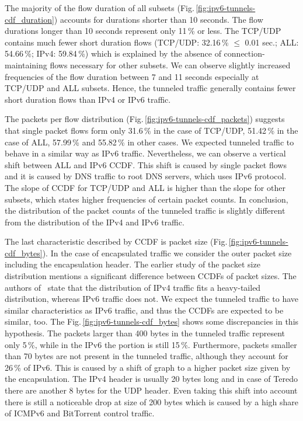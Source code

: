 The majority of the flow duration of all subsets (Fig.\,\ref{fig:ipv6-tunnels-cdf_duration}) accounts for durations shorter than 10 seconds. The flow durations longer than 10 seconds represent only 11\,\% or less. The TCP/UDP contains much fewer short duration flows (TCP/UDP: 32.16\,\% $\leq$ 0.01 sec.; ALL: 54.66\,\%; IPv4: 59.84\,\%) which is explained by the absence of connection-maintaining flows necessary for other subsets. We can observe slightly increased frequencies of the flow duration between 7 and 11 seconds especially at TCP/UDP and ALL subsets. Hence, the tunneled traffic generally contains fewer short duration flows than IPv4 or IPv6 traffic.

The packets per flow distribution (Fig.\,\ref{fig:ipv6-tunnels-cdf_packets}) suggests that single packet flows form only 31.6\,\% in the case of TCP/UDP, 51.42\,\% in the case of ALL, 57.99\,\% and 55.82\,\% in other cases. We expected tunneled traffic to behave in a similar way as IPv6 traffic. Nevertheless, we can observe a vertical shift between ALL and IPv6 CCDF. This shift is caused by single packet flows and it is caused by DNS traffic to root DNS servers, which uses IPv6 protocol. The slope of CCDF for TCP/UDP and ALL is higher than the slope for other subsets, which states higher frequencies of certain packet counts. In conclusion, the distribution of the packet counts of the tunneled traffic is slightly different from the distribution of the IPv4 and IPv6 traffic.

The last characteristic described by CCDF is packet size (Fig.\,\ref{fig:ipv6-tunnels-cdf_bytes}). In the case of encapsulated traffic we consider the outer packet size including the encapsulation header. The earlier study of the packet size distribution mentions a significant difference between CCDFs of packet sizes. The authors of~\cite{ciflikli} state that the distribution of IPv4 traffic fits a heavy-tailed distribution, whereas IPv6 traffic does not. We expect the tunneled traffic to have similar characteristics as IPv6 traffic, and thus the CCDFs are expected to be similar, too. The Fig.\,\ref{fig:ipv6-tunnels-cdf_bytes} shows some discrepancies in this hypothesis. The packets larger than 400 bytes in the tunneled traffic represent only 5\,\%, while in the IPv6 the portion is still 15\,\%. Furthermore, packets smaller than 70 bytes are not present in the tunneled traffic, although they account for 26\,\% of IPv6. This is caused by a shift of graph to a higher packet size given by the encapsulation. The IPv4 header is usually 20 bytes long and in case of Teredo there are another 8 bytes for the UDP header. Even taking this shift into account there is still a noticeable drop at size of 200 bytes which is caused by a high share of ICMPv6 and BitTorrent control traffic.


